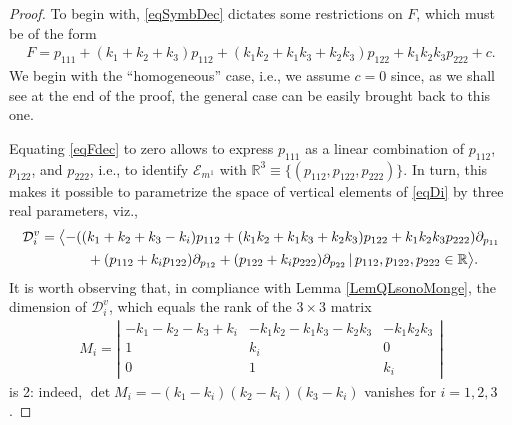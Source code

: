 \documentclass[10pt,a4paper]{amsart}
\newcommand{\R}{\mathbb{R}}
\newcommand{\D}{\mathcal{D}}
\newcommand{\E}{\mathcal{E}}
\numberwithin{equation}{section}
\begin{document}
\begin{proof}
To begin with, \eqref{eqSymbDec} dictates some restrictions on $F$, which must be of the form %
 \begin{gather}\label{eqFdec}
F=p_{111}+(k_1+k_2+k_3)p_{112}+(k_1k_2+k_1k_3+k_2k_3)p_{122}+k_1k_2k_3p_{222}+c.
\end{gather}
We begin with the ``homogeneous'' case, i.e., we assume $c=0$ since, as we shall see at the end of the proof, the general case can be easily brought back to this one.

Equating \eqref{eqFdec} to zero allows to express $p_{111}$ as a linear combination of $p_{112}$, $p_{122}$, and $p_{222}$, i.e., to identify $\E_{m^1}$ with $\R^3\equiv\{(p_{112},p_{122},p_{222})\}$. In turn, this makes it possible to parametrize the space of vertical elements of \eqref{eqDi} by three real parameters, viz.,
\begin{gather}
 \D_i^v= \big\langle{-}({ (k_1+k_2+k_3-k_i)p_{112}+(k_1k_2+k_1k_3+k_2k_3)p_{122}+ k_1k_2k_3p_{222}})\partial_{p_{11}} \nonumber\\
\hphantom{\D_i^v= \big\langle}{} +({ p_{112}+k_ip_{122}})\partial_{p_{12}}+({ p_{122}+k_ip_{222}})\partial_{p_{22}}\,|\, { p_{112},p_{122},p_{222}}\in\R\big\rangle. \label{eqDiPar}
\end{gather}
It is worth observing that, in compliance with Lemma \ref{LemQLsonoMonge}, the dimension of $\D_i^v$, which
equals the rank of the $3\times 3$ matrix
\begin{gather}\label{eqMi}
M_i=\left|\begin{matrix}-k_1-k_2-k_3+k_i & -k_1k_2-k_1k_3-k_2k_3 & -k_1k_2k_3 \\1 & k_i & 0 \\0 & 1 & k_i\end{matrix}\right|
\end{gather}
 is 2: indeed,
$\det M_i= -(k_1-k_i)(k_2-k_i)(k_3-k_i)$
vanishes for $i=1,2,3$.


\end{proof}
\end{document}

